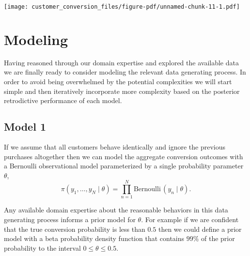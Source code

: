 \documentclass[
  letterpaper,
  DIV=11,
  numbers=noendperiod]{scrartcl}
\newenvironment{Shaded}{\begin{snugshade}}{\end{snugshade}}
\newcommand{\AttributeTok}[1]{\textcolor[rgb]{0.40,0.45,0.13}{#1}}
\newcommand{\DecValTok}[1]{\textcolor[rgb]{0.68,0.00,0.00}{#1}}
\newcommand{\FloatTok}[1]{\textcolor[rgb]{0.68,0.00,0.00}{#1}}
\newcommand{\FunctionTok}[1]{\textcolor[rgb]{0.28,0.35,0.67}{#1}}
\newcommand{\NormalTok}[1]{\textcolor[rgb]{0.00,0.23,0.31}{#1}}
\newcommand{\OtherTok}[1]{\textcolor[rgb]{0.00,0.23,0.31}{#1}}
\newcommand{\SpecialCharTok}[1]{\textcolor[rgb]{0.37,0.37,0.37}{#1}}
\newcommand{\StringTok}[1]{\textcolor[rgb]{0.13,0.47,0.30}{#1}}
\begin{document}
\texttt{[image: customer\_conversion\_files/figure-pdf/unnamed-chunk-11-1.pdf]}

\section{Modeling}\label{modeling}

Having reasoned through our domain expertise and explored the available
data we are finally ready to consider modeling the relevant data
generating process. In order to avoid being overwhelmed by the potential
complexities we will start simple and then iteratively incorporate more
complexity based on the posterior retrodictive performance of each
model.

\subsection{Model 1}\label{model-1}

If we assume that all customers behave identically and ignore the
previous purchases altogether then we can model the aggregate conversion
outcomes with a Bernoulli observational model parameterized by a single
probability parameter \(\theta\), \[
\pi(y_{1}, \ldots, y_{N} \mid \theta)
=
\prod_{n = 1}^{N} \text{Bernoulli} \,(y_{n} \mid \theta).
\]

Any available domain expertise about the reasonable behaviors in this
data generating process informs a prior model for \(\theta\). For
example if we are confident that the true conversion probability is less
than \(0.5\) then we could define a prior model with a beta probability
density function that contains \(99\%\) of the prior probability to the
interval \(0 \le \theta \le 0.5\).

\begin{Shaded}
\end{Shaded}
\end{document}
